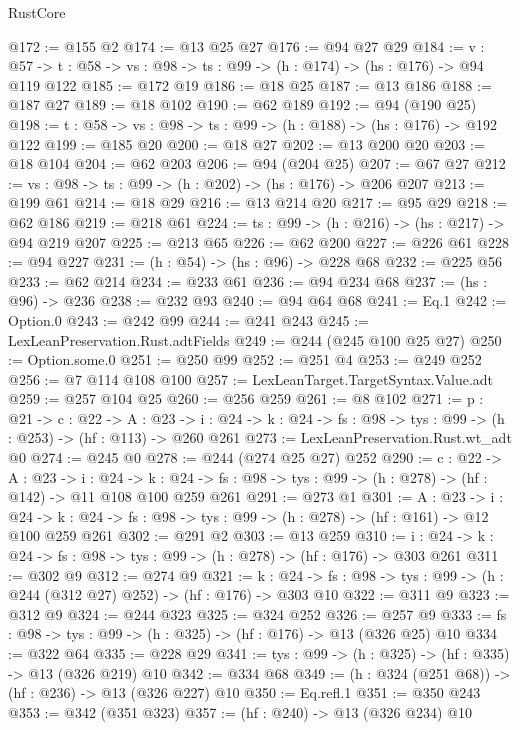 \begin{lexlean}{RustCore}
\begin{coremodule}
@172 := @155 @2
@174 := @13 @25 @27
@176 := @94 @27 @29
@184 := {v : @57} ->
  {t : @58} -> {vs : @98} -> {ts : @99} -> (h : @174) -> (hs : @176) -> @94 @119 @122
@185 := @172 @19
@186 := @18 @25
@187 := @13 @186
@188 := @187 @27
@189 := @18 @102
@190 := @62 @189
@192 := @94 (@190 @25)
@198 := {t : @58} -> {vs : @98} -> {ts : @99} -> (h : @188) -> (hs : @176) -> @192 @122
@199 := @185 @20
@200 := @18 @27
@202 := @13 @200 @20
@203 := @18 @104
@204 := @62 @203
@206 := @94 (@204 @25)
@207 := @67 @27
@212 := {vs : @98} -> {ts : @99} -> (h : @202) -> (hs : @176) -> @206 @207
@213 := @199 @61
@214 := @18 @29
@216 := @13 @214 @20
@217 := @95 @29
@218 := @62 @186
@219 := @218 @61
@224 := {ts : @99} -> (h : @216) -> (hs : @217) -> @94 @219 @207
@225 := @213 @65
@226 := @62 @200
@227 := @226 @61
@228 := @94 @227
@231 := (h : @54) -> (hs : @96) -> @228 @68
@232 := @225 @56
@233 := @62 @214
@234 := @233 @61
@236 := @94 @234 @68
@237 := (hs : @96) -> @236
@238 := @232 @93
@240 := @94 @64 @68
@241 := Eq.{1}
@242 := Option.{0}
@243 := @242 @99
@244 := @241 @243
@245 := LexLeanPreservation.Rust.adtFields
@249 := @244 (@245 @100 @25 @27)
@250 := Option.some.{0}
@251 := @250 @99
@252 := @251 @4
@253 := @249 @252
@256 := @7 @114 @108 @100
@257 := LexLeanTarget.TargetSyntax.Value.adt
@259 := @257 @104 @25
@260 := @256 @259
@261 := @8 @102
@271 := {p : @21} ->
  {c : @22} ->
  {A : @23} ->
  {i : @24} -> {k : @24} -> {fs : @98} -> {tys : @99} -> (h : @253) -> (hf : @113) -> @260 @261
@273 := LexLeanPreservation.Rust.wt_adt @0
@274 := @245 @0
@278 := @244 (@274 @25 @27) @252
@290 := {c : @22} ->
  {A : @23} ->
  {i : @24} ->
  {k : @24} -> {fs : @98} -> {tys : @99} -> (h : @278) -> (hf : @142) -> @11 @108 @100 @259 @261
@291 := @273 @1
@301 := {A : @23} ->
  {i : @24} ->
  {k : @24} -> {fs : @98} -> {tys : @99} -> (h : @278) -> (hf : @161) -> @12 @100 @259 @261
@302 := @291 @2
@303 := @13 @259
@310 := {i : @24} ->
  {k : @24} -> {fs : @98} -> {tys : @99} -> (h : @278) -> (hf : @176) -> @303 @261
@311 := @302 @9
@312 := @274 @9
@321 := {k : @24} ->
  {fs : @98} -> {tys : @99} -> (h : @244 (@312 @27) @252) -> (hf : @176) -> @303 @10
@322 := @311 @9
@323 := @312 @9
@324 := @244 @323
@325 := @324 @252
@326 := @257 @9
@333 := {fs : @98} -> {tys : @99} -> (h : @325) -> (hf : @176) -> @13 (@326 @25) @10
@334 := @322 @64
@335 := @228 @29
@341 := {tys : @99} -> (h : @325) -> (hf : @335) -> @13 (@326 @219) @10
@342 := @334 @68
@349 := (h : @324 (@251 @68)) -> (hf : @236) -> @13 (@326 @227) @10
@350 := Eq.refl.{1}
@351 := @350 @243
@353 := @342 (@351 @323)
@357 := (hf : @240) -> @13 (@326 @234) @10

\end{coremodule}
\end{lexlean}
